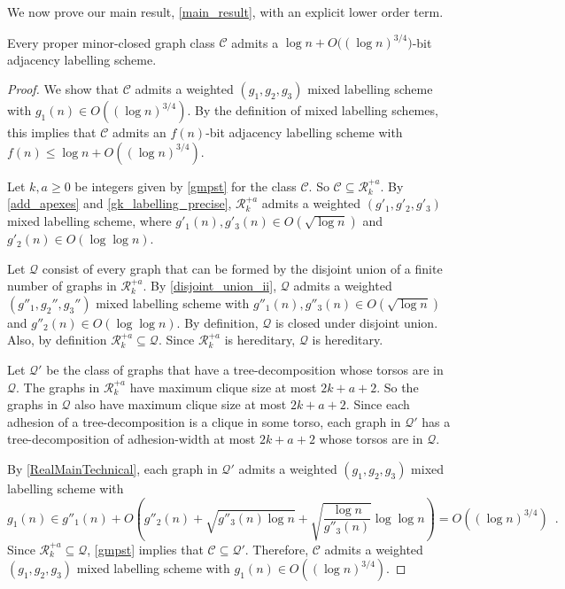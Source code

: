\documentclass{patmorin}
\renewcommand{\le}{\leqslant}
\renewcommand{\geq}{\geqslant}
\newcommand{\Oh}{O}
\newcommand{\calC}{\mathcal{C}}
\newcommand{\calQ}{\mathcal{Q}}
\newcommand{\calR}{\mathcal{R}}
\begin{document}
We now prove our main result, \cref{main_result}, with an explicit lower order term.

\begin{lem}
  \label{main_result_detailed}
  Every proper minor-closed graph class $\calC$  admits a $\log n + \Oh\big((\log n)^{3/4}\big)$-bit adjacency labelling scheme.
\end{lem}

\begin{proof}
  We show that $\calC$ admits a weighted $(g_1,g_2,g_3)$ mixed labelling scheme with $g_1(n) \in \Oh((\log n)^{3/4})$. By the definition of mixed labelling schemes, this implies that $\calC$ admits an $f(n)$-bit adjacency labelling scheme with $f(n)\le\log n + \Oh((\log n)^{3/4})$.

  Let $k,a\geq 0$ be integers given by \cref{gmpst} for the class $\calC$. So $\calC\subseteq \calR_k^{+a}$. By \cref{add_apexes} and \cref{gk_labelling_precise}, $\calR_k^{+a}$ admits a weighted $(g'_1,g'_2,g'_3)$ mixed labelling scheme, where $g'_1(n),g'_3(n)\in \Oh(\sqrt{\log n})$ and $g'_2(n)\in \Oh(\log\log n)$.

  Let $\calQ$ consist of every graph that can be formed by the disjoint union of a finite number of graphs in $\calR_k^{+a}$.  By \cref{disjoint_union_ii}, $\calQ$ admits a weighted $(g''_1,g_2'',g_3'')$ mixed labelling scheme with $g''_1(n),g''_3(n)\in \Oh(\sqrt{\log n})$ and $g''_2(n)\in \Oh(\log\log n)$.   By definition, $\calQ$ is closed under disjoint union.  Also, by definition  $\calR_k^{+a}\subseteq\calQ$. Since $\calR_k^{+a}$ is hereditary, $\calQ$ is hereditary.

  Let $\calQ'$ be the class of graphs that have a tree-decomposition whose torsos are in $\calQ$.  The graphs in $\calR_k^{+a}$ have maximum clique size at most $2k+a+2$.  So the graphs in $\calQ$ also have maximum clique size at most $2k+a+2$. Since each adhesion of a tree-decomposition is a clique in some torso,   each graph in $\calQ'$ has a tree-decomposition 
  of adhesion-width at most $2k+a+2$ whose torsos are in $\calQ$.

  By \cref{RealMainTechnical}, each graph in $\calQ'$ admits a weighted $(g_1,g_2,g_3)$ mixed labelling scheme with
  \[
    g_1(n) \in g''_1(n) + \Oh\left(g''_2(n) + \sqrt{g''_3(n)\log n}
    + \sqrt{\frac{\log n}{g''_3(n)}}\log\log n\right) = \Oh((\log n)^{3/4}) \enspace.
  \]
  Since $\calR_k^{+a}\subseteq\calQ$, \cref{gmpst} implies that $\calC\subseteq\calQ'$.  Therefore, $\calC$ admits a weighted $(g_1,g_2,g_3)$ mixed labelling scheme with $g_1(n)\in \Oh((\log n)^{3/4})$.
\end{proof}
\end{document}
